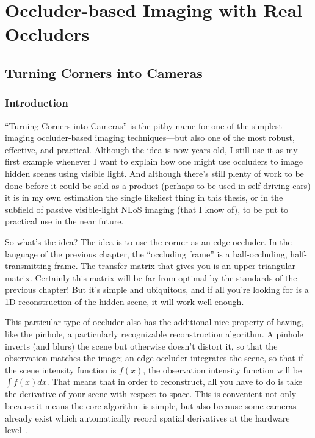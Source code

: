 \chapter{Occluder-based Imaging with Real Occluders}

\section{Turning Corners into Cameras}

\subsection{Introduction}

``Turning Corners into Cameras'' is the pithy name for one of the simplest imaging occluder-based imaging techniques---but also one of the most robust, effective, and practical. Although the idea is now years old, I still use it as my first example whenever I want to explain how one might use occluders to image hidden scenes using visible light. And although there's still plenty of work to be done before it could be sold as a product (perhaps to be used in self-driving cars) it is in my own estimation the single likeliest thing in this thesis, or in the subfield of passive visible-light NLoS imaging (that I know of), to be put to practical use in the near future.

So what's the idea? The idea is to use the corner as an edge occluder. In the language of the previous chapter, the ``occluding frame'' is a half-occluding, half-transmitting frame. The transfer matrix that gives you is an upper-triangular matrix. Certainly this matrix will be far from optimal by the standards of the previous chapter! But it's simple and ubiquitous, and if all you're looking for is a 1D reconstruction of the hidden scene, it will work well enough.

This particular type of occluder also has the additional nice property of having, like the pinhole, a particularly recognizable reconstruction algorithm. A pinhole inverts (and blurs) the scene but otherwise doesn't distort it, so that the observation matches the image; an edge occluder integrates the scene, so that if the scene intensity function is $f(x)$, the observation intensity function will be $\int f(x) dx$. That means that in order to reconstruct, all you have to do is take the derivative of your scene with respect to space. This is convenient not only because it means the core algorithm is simple, but also because some cameras already exist which automatically record spatial derivatives at the hardware level~\cite{TODO}.

